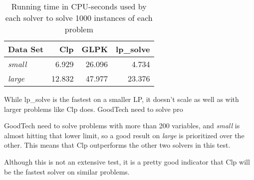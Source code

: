 \begin{table}[h!]
    \centering
    \caption{Running time in CPU-seconds used by each solver to solve 1000
             instances of each problem}
    \begin{tabular}{lrrr}
        Data Set       & Clp    & GLPK   & lp\_solve \\ \hline
        \textit{small} & 6.929  & 26.096 & 4.734 \\
        \textit{large} & 12.832 & 47.977 & 23.376
    \end{tabular}
    \label{table:lpres}
\end{table}

While lp\_solve is the fastest on a smaller LP, it doesn't scale as well as
with larger problems like Clp does. GoodTech need to solve pro

GoodTech need to solve problems with more than 200 variables, and
\textit{small} is almost hitting that lower limit, so a good result on
\textit{large} is prioritized over the other.
This means that Clp outperforms the other two solvers in this test.

Although this is not an extensive test, it is a pretty good indicator that Clp
will be the fastest solver on similar problems.
